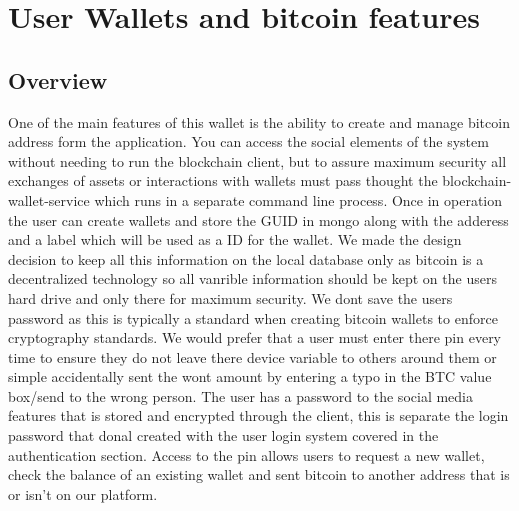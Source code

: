 \section{User Wallets and bitcoin features}

\subsection{Overview}
One of the main features of this wallet is the ability to create and manage bitcoin address form the application. You can access the social elements of the system without needing to run the blockchain client, but to assure maximum security all exchanges of assets or interactions with wallets must pass thought the blockchain-wallet-service which runs in a separate command line process. Once in operation the user can create wallets and store the GUID in mongo along with the adderess and a label which will be used as a ID for the wallet. We made the design decision to keep all this information on the local database only as bitcoin is a decentralized technology so all vanrible information should be kept on the users hard drive and only there for maximum security. We dont save the users password as this is typically a standard when creating bitcoin wallets to enforce cryptography standards. We would prefer that a user must enter there pin every time to ensure they do not leave there device variable to others around them or simple accidentally sent the wont amount by entering a typo in the BTC value box/send to the wrong person. The user has a password to the social media features that is stored and encrypted through the client, this is separate the login password that donal created with the user login system covered in the authentication section. Access to the pin allows users to request a new wallet, check the balance of an existing wallet and sent bitcoin to another address that is or isn't on our platform.

